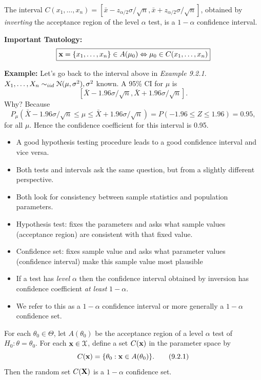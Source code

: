 \documentclass[11pt,]{article}
\newcommand{\Xndots}{X_1, \ldots, X_n}
\def\bx{{\bf x}}
\def\bX{{\bf X}}
\def\xbar{\bar{ x}}
\def\Xbar{\bar{ X}}
\def\Nsc{{\cal N}}
\def\Xsc{{\cal X}}
\begin{document}
The interval
\(C(x_1,\ldots,x_n) = [\xbar - z_{\alpha/2}\sigma/\sqrt{n}, \xbar + z_{\alpha/2}\sigma/\sqrt{n}]\),
obtained by \emph{inverting} the acceptance region of the level
\(\alpha\) test, is a \(1-\alpha\) confidence interval.

\textbf{Important Tautology:}
\[\boxed{\bx = \{x_1, \ldots, x_n\} \in A(\mu_0) \Leftrightarrow \mu_0 \in C(x_1,\ldots,x_n)}\]

\textbf{Example:} Let's go back to the interval above in \emph{Example
9.2.1}. \(\Xndots \sim_{iid} \Nsc(\mu,\sigma^2), \sigma^2\) known. A
95\% CI for \(\mu\) is
\[\left[\Xbar - 1.96 \sigma/\sqrt{n}, \Xbar + 1.96 \sigma/\sqrt{n}\right].\]
Why? Because
\[P_\mu (\Xbar - 1.96 \sigma/\sqrt{n} \leq \mu \leq \Xbar + 1.96 \sigma/\sqrt{n}) = P(-1.96 \leq Z \leq 1.96) = 0.95,\]
for all \(\mu\). Hence the confidence coefficient for this interval is
0.95.

\begin{itemize}
\item A good hypothesis testing procedure leads to a good confidence interval and vice versa.
\item Both tests and intervals ask the same question, but from a slightly different perspective.
\item Both look for consistency between sample statistics and population parameters.
\item Hypothesis test: fixes the parameters and asks what sample values (acceptance region) are consistent with that fixed value.
\item Confidence set: fixes sample value and asks what parameter values (confidence interval) make this sample value most plausible
\item If a test has {\em level} $\alpha$ then the confidence interval obtained by inversion has confidence coefficient {\em at least} $1-\alpha$.
\item We refer to this as a $1-\alpha$ confidence interval or more generally a $1-\alpha$ confidence set.
\end{itemize}

 For each \(\theta_0 \in \Theta\), let
\(A(\theta_0)\) be the acceptance region of a level \(\alpha\) test of
\(H_0: \theta = \theta_0\). For each \(\bx \in \Xsc\), define a set
\(C(\bx)\) in the parameter space by \begin{equation}
C(\bx) = \{ \theta_0 : \bx \in A(\theta_0) \}.  \tag{9.2.1}
\end{equation} Then the random set \(C(\bX)\) is a \(1-\alpha\)
confidence set.
\end{document}
